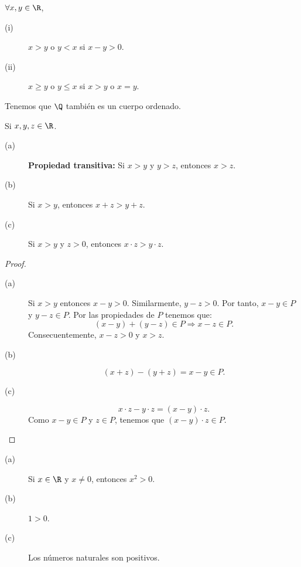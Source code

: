 \begin{fdefinition}[]
\normalfont $\displaystyle \forall x,y \in \R $, 
\begin{description}
\item[(i)] $\displaystyle x>y $ o $\displaystyle y<x $ si $\displaystyle x-y>0 $. 
\item[(ii)] $\displaystyle x \geq y $ o $\displaystyle y \leq x $ si $\displaystyle x>y $ o $\displaystyle x = y $.
\end{description}
\end{fdefinition}

Tenemos que $\displaystyle \Q $ también es un cuerpo ordenado.

\begin{ftheorem}[]
\normalfont Si $\displaystyle x,y,z\in \R $. 
\begin{description}
\item[(a)] \textbf{Propiedad transitiva:} Si $\displaystyle x>y $ y $\displaystyle y > z $, entonces $\displaystyle x >z $. 
\item[(b)] Si $\displaystyle x>y $, entonces $\displaystyle x + z > y + z $. 
\item[(c)] Si $\displaystyle x>y $ y $\displaystyle z>0 $, entonces $\displaystyle x \cdot z > y \cdot z $. 
\end{description}
\end{ftheorem}

\begin{proof}
\begin{description} 
\item[(a)] Si $\displaystyle x>y $ entonces $\displaystyle x-y>0 $. Similarmente, $\displaystyle y-z>0 $. Por tanto, $\displaystyle x - y \in P $ y $\displaystyle y - z \in P $. Por las propiedades de $\displaystyle P $ tenemos que:
	\[\left(x-y\right)+\left(y-z\right) \in P \Rightarrow x - z \in P .\]
Consecuentemente, $\displaystyle x - z >0 $ y $\displaystyle x > z $. 
\item[(b)] 
	\[\left(x+z\right)-\left(y+z\right) = x - y \in P .\]
\item[(c)] 
	\[x \cdot z - y \cdot z = \left(x - y\right) \cdot z .\]
Como $\displaystyle x - y \in P $ y $\displaystyle z \in P $, tenemos que $\displaystyle \left(x - y\right) \cdot z \in P $. 
\end{description}
\end{proof}

\begin{ftheorem}[]
\normalfont 
\begin{description}
\item[(a)] Si $\displaystyle x \in \R $ y $\displaystyle x \neq 0 $, entonces $\displaystyle x^{2}>0 $. 
\item[(b)] $\displaystyle 1>0 $.
\item[(c)] Los números naturales son positivos.
\end{description}
\end{ftheorem}

